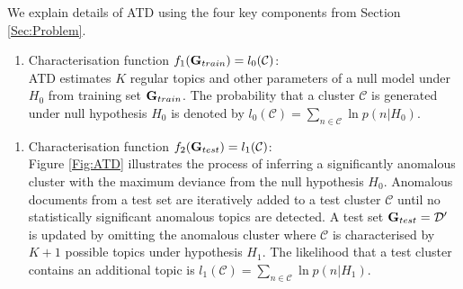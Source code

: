 We explain details of ATD using the four key components from Section \ref{Sec:Problem}. 
\begin{enumerate}[1.]
\item Characterisation function $f_1({\bf G}_{train})=l_0(\mathcal{C})$: \\ 
ATD estimates $K$ regular topics and other  parameters  of a null model under $H_0$  from  training set ${\bf G}_{train}$.  
The probability that a cluster $\mathcal{C}$ is generated under null hypothesis $H_0$  is denoted by 
$l_0(\mathcal{C}) = \sum_{n  \in \mathcal{C} } \ln p( n| H_0 ) $. 
\end{enumerate}
%
\begin{enumerate}[2.]
\item Characterisation function $f_2({\bf G}_{test})=l_1(\mathcal{C})$: \\
  Figure \ref{Fig:ATD} illustrates the process of inferring a significantly anomalous cluster with the maximum deviance  from the null hypothesis $H_0$.  
 Anomalous documents from a test set  are  iteratively added to a test cluster $\mathcal{C}$ until  no  statistically significant anomalous topics are detected.   %
  A test set ${\bf G}_{test}=\mathcal{D}'$ is updated by omitting the anomalous cluster where $\mathcal{C}$ is characterised by $K+1$ possible topics under hypothesis $H_1$. The likelihood  that a test cluster contains an additional topic is $l_1(\mathcal{C}) = \sum_{n \in \mathcal{C} } \ln p(n | H_1 )$. 


\end{enumerate}
